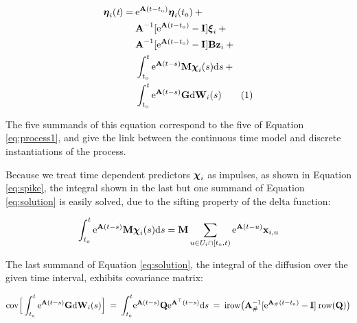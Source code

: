 \documentclass[nojss]{jss}\usepackage[]{graphicx}\usepackage[]{color}
\newcommand\numberthis{\addtocounter{equation}{1}\tag{\theequation}} %
\begin{document}
\begin{align*}
\boldsymbol{\eta}_\mathnormal{i}(\textit{t}) = \: &
\mathrm{e}^{ \textbf{A} (\mathnormal{t-t_0})  }  \boldsymbol{\eta}_\mathnormal{i}(\mathnormal{t_0}) \: + \\
&\textbf{A}^{-1} [\mathrm{e}^{\textbf{A} \mathnormal{(t-t_0)} } - \textbf{I}] \boldsymbol{\xi}_\mathnormal{i} \: + \\
&\textbf{A}^{-1} [\mathrm{e}^{\textbf{A} \mathnormal{(t-t_0)} } - \textbf{I}]\textbf{Bz}_\mathnormal{i} \: + \\
& \int_{\mathnormal{t_0}}^\mathnormal{t} \mathrm{e}^{\mathbf{A}(t-s)} \mathbf{M}\boldsymbol{\chi}_\mathnormal{i} ( \mathnormal{s})  \textrm{d} \mathnormal{s} \: + \\
&\int_{\mathnormal{t_0}}^\mathnormal{t} \mathrm{e}^{\textbf{A} \mathnormal{(t-s)} } \textbf{G}\textrm{d}\textbf{W}_\mathnormal{i}\mathnormal{(s)} \numberthis 
\label{eq:solution}
\end{align*}

The five summands of this equation correspond to the five of Equation \ref{eq:process1}, and give the
link between the continuous time model and discrete instantiations of the process. 

Because we treat time dependent predictors $\boldsymbol{\chi}_\mathnormal{i}$ as impulses, as shown in Equation \ref{eq:spike}, the integral shown in the last but one summand of Equation \ref{eq:solution} is easily solved, due to the sifting property of the delta function: 

\begin{equation}
\int_{\mathnormal{t_0}}^\mathnormal{t} \mathrm{e}^{\mathbf{A}(t-s)} \mathbf{M}\boldsymbol{\chi}_\mathnormal{i} ( \mathnormal{s})  \textrm{d} \mathnormal{s} =\mathbf{M}\sum_{\mathnormal{u \in U_i \cap [t_0,t)}} \mathrm{e}^{\mathbf{A}(t-u)} \mathbf{x}_{i,u}     
 \end{equation}

The last summand of Equation \ref{eq:solution}, the integral of the diffusion over the given time interval, exhibits covariance matrix:

\begin{equation}
\label{eq:dyncov}
\mathrm{cov \Big[ \int_{\mathnormal{t_0}}^\mathnormal{t} \mathrm{e}^{\textbf{A}(\mathnormal{t-s})} \textbf{G}d\textbf{W}_\mathnormal{i}(\mathnormal{s})\Big] \: 
= \: \mathnormal{\int_{t_0}^t } \mathrm{e}^{\textbf{A} \mathnormal{(t-s)} }\textbf{Q} \mathrm{e}^{\textbf{A}^\top \mathnormal{(t-s)}} d\mathnormal{s} \: 
= \: irow \big( \textbf{A}_{\#}^{-1} [\mathrm{e}^{\textbf{A}_{\#} \mathnormal{(t-t_0)} } - \textbf{I}] \: row (\textbf{Q}) \big) }
\end{equation}
\end{document}
